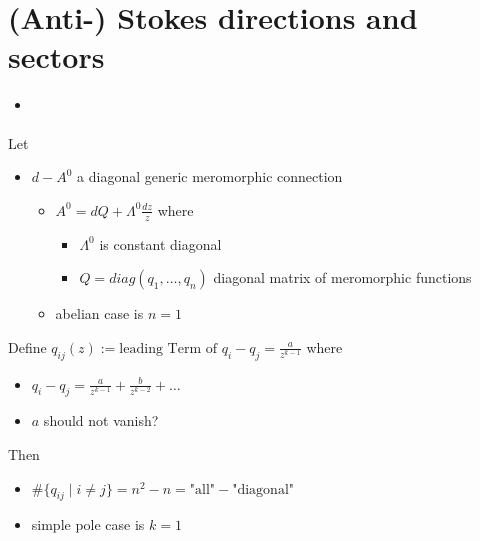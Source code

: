 \section{(Anti-) Stokes directions and sectors}%
\begin{frame}[t]
  {\Huge\insertsection{}}
  \begin{itemize}
    \item \cite{boalch}
  \end{itemize}
Let
\begin{itemize}
  \item $d-A^0$ a diagonal generic meromorphic connection
    \begin{itemize}
      \item $A^0=dQ+\Lambda^0\frac{dz}{z}$ where
        \begin{itemize}
          \item $\Lambda^0$ is constant diagonal
          \item $Q=diag(q_1,\dots,q_n)$ diagonal matrix of meromorphic functions
        \end{itemize}
      \item abelian case is $n=1$
    \end{itemize}
  \end{itemize}
  Define $q_{ij}(z):=\text{leading Term of }q_i-q_j = \frac{a}{z^{k-1}}$ where
  \begin{itemize}
    \item $q_i-q_j = \frac{a}{z^{k-1}} + \frac{b}{z^{k-2}}+\dots$
    \item $a$ should \textcolor{red!60!black}{not vanish?}
  \end{itemize}
  Then
  \begin{itemize}
    \item $\#\{q_{ij}\mid i \neq j\}=n^2-n=\text{"all"}-\text{"diagonal"}$
    \item simple pole case is $k=1$
  \end{itemize}
\end{frame}

